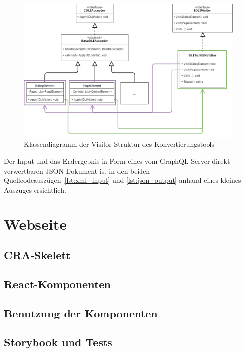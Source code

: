 \begin{figure}
    \centering
    \captionsetup{justification=centering}
    \includegraphics[width=\textwidth]{figures/web-converter_class-diagramm.png}
        \caption{Klassendiagramm der Visitor-Struktur des Konvertierungstools}\label{fig:web-conv_class-diagramm}
\end{figure}

Der Input und das Endergebnis in Form eines vom GraphQL-Server direkt verwertbaren JSON-Dokument ist in den beiden Quellcodeauszügen~\ref{lst:xml_input} und \ref{lst:json_output} anhand eines kleines Auszuges ersichtlich.




\section{Webseite}

\subsection{CRA-Skelett}
\subsection{React-Komponenten}

\subsection{Benutzung der Komponenten}
\subsection{Storybook und Tests}
